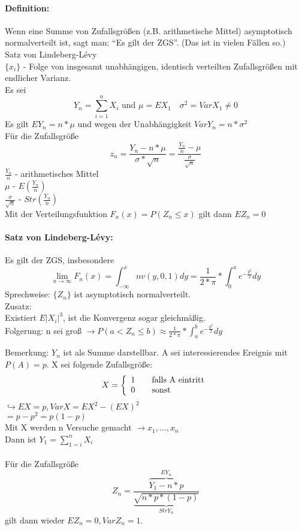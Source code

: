\documentclass[a4paper,12pt]{scrartcl}
\begin{document}
 \paragraph{Definition:} Wenn eine Summe von Zufallsgrößen (z.B. arithmetische Mittel) asymptotisch normalverteilt ist, sagt man: "`Es gilt der ZGS"'. (Das ist in vielen Fällen so.)\\
 Satz von Lindeberg-Lévy\\
 $\{x_i\}$ - Folge von insgesamt unabhängigen, identisch verteilten Zufallsgrößen mit endlicher Varianz.\\
 Es sei
 $$Y_n = \sum_{i=1}^nX_i\text{  und  }\mu=EX_1\quad \sigma^2 = VarX_1 \neq 0$$
 Es gilt $EY_n = n*\mu$ und wegen der Unabhängigkeit $VarY_n = n*\sigma^2$\\
 Für die Zufallsgröße
 $$z_n = \frac{Y_n-n*\mu}{\sigma * \sqrt{n}} = \frac{\frac{Y_n}{n}-\mu}{\frac{\sigma}{\sqrt{n}}}$$
 $\frac{Y_n}{n}$ - arithmetisches Mittel\\
 $\mu$  - $E(\frac{Y_n}{n})$\\
 $\frac{\sigma}{\sqrt{n}} $ - $Str(\frac{Y_n}{n})$\\
 Mit der Verteilungsfunktion $F_n(x) = P(Z_n \leq x)$ gilt dann $EZ_n = 0$\\
 \paragraph{Satz von Lindeberg-Lévy:} Es gilt der ZGS, insbesondere
 $$\lim_{n\rightarrow\infty}F_n(x) = \int^x_{-\infty}nv(y,0,1)dy = \frac{1}{2*\pi}*\int^x_0e^{-\frac{y^2}{2}}dy $$
 Sprechweise: $\{Z_n\}$ ist asymptotisch normalverteilt.\\
 Zusatz:\\
 Existiert $E|X_i|^3$, ist die Konvergenz sogar gleichmäßig.\\
 Folgerung: n sei groß $\rightarrow P(a<Z_n\leq b) \approx \frac{1}{2*\pi}*\int^b_a e^{-\frac{y^2}{2}} dy$
 
  Bemerkung: $Y_n$ ist als Summe darstellbar. A sei interessierendes Ereignis mit $P(A) = p$. X sei folgende Zufallsgröße:
  $$X=\left\{ 
  \begin{array}{l l }
    1 & \quad \text{falls A eintritt}\\
    0 & \quad \text{sonst} 
  \end{array} \right. $$
  $\hookrightarrow EX=p, VarX = EX^2-(EX)^2$\\
  $=p-p^2=p(1-p)$\\
  Mit X werden n Versuche gemacht $\rightarrow x_1,\dots,x_n$\\
  Dann ist $Y_1 = \sum\limits^{n}_{1=i}X_i$\\
  \\
  Für die Zufallsgröße
  $$Z_n = \frac{\overbrace{Y_1-n*p}^{EY_n}}{\underbrace{\sqrt{n*p*(1-p)}}_{StrY_n}}$$
  gilt dann wieder $EZ_n = 0, VarZ_n = 1$.\\
\end{document}
